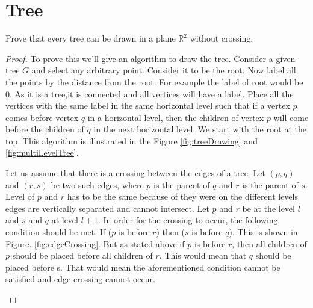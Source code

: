 \documentclass{article}
\def\R{\mathbb{R}}
\begin{document}
\section{Tree}
\begin{theorem}
  Prove that every tree can be drawn in a plane $\R^2$  without crossing.
  \end{theorem}
      \begin{proof}
 To prove this we'll give an algorithm to draw the tree. Consider a given tree $G$ and select any arbitrary point. Consider it to be the root. Now label all the points by the distance from the root. For example the label of root would be 0. As it is a tree,it is connected and all vertices will have a label. Place all the vertices with the same label in the same horizontal level such that if a vertex $p$ comes before vertex $q$ in a horizontal level, then the children of vertex $p$ will come before the children of $q$ in the next horizontal level. We start with the root at the top. This algorithm is illustrated in the Figure \ref{fig:treeDrawing} and \ref{fig:multiLevelTree}.

Let us assume that there is a crossing between the edges of a tree. Let $(p,q)$ and $(r,s)$ be two such edges, where $p$ is the parent of $q$ and $r$ is the parent of $s$. Level of $p$ and $r$ has to be the same because of they were on the different levels edges are vertically separated and cannot intersect. Let $p$ and $r$ be at the level $l$ and $s$ and $q$ at level $l+1$. In order for the crossing to occur, the following condition should be met. If ($p$ is before $r$) then ($s$ is before $q$). This is shown in Figure. \ref{fig:edgeCrossing}. But as stated above if $p$ is before $r$, then all children of $p$ should be placed before all children of $r$. This would mean that $q$ should be placed before s. That would mean the aforementioned condition cannot be satisfied and edge crossing cannot occur.
          \begin{figure}[h!]
\begin{center}

    
    \begin{tikzpicture}[x=0.75pt,y=0.75pt,yscale=-1,xscale=1]
    

\end{tikzpicture}
\end{center}
\end{figure}
\end{proof}
\end{document}
